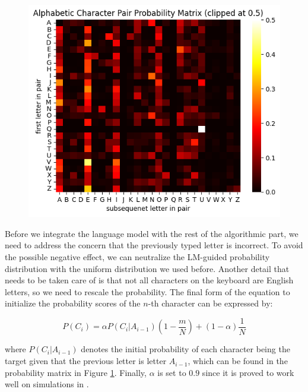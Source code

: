 \documentclass{article}
\begin{document}
\vspace{-3mm}
\begin{figure}[H]
	\centering
	\includegraphics[width=0.5\linewidth]{2gram.png}
	\label{fig:4}
\end{figure}

\vspace{-3mm}
Before we integrate the language model with the rest of the algorithmic part, we need to address the concern that the previously typed letter is incorrect. To avoid the possible negative effect, we can neutralize the LM-guided probability distribution with the uniform distribution we used before. Another detail that needs to be taken care of is that not all characters on the keyboard are English letters, so we need to rescale the probability. The final form of the equation to initialize the probability scores of the $n$-th character can be expressed by:

\begin{equation} \label{eq:4}
	P(C_i) = \alpha P(C_i|A_{i-1})(1 - \frac{m}{N}) + (1-\alpha)\frac{1}{N}
\end{equation}

where $P(C_i|A_{i-1})$ denotes the initial probability of each character being the target given that the previous letter is letter $A_{i-1}$, which can be found in the probability matrix in Figure \ref{fig:4}. Finally, $\alpha$ is set to $0.9$ since it is proved to work well on simulations in \cite{mainsah2014utilizing}.
\end{document}
